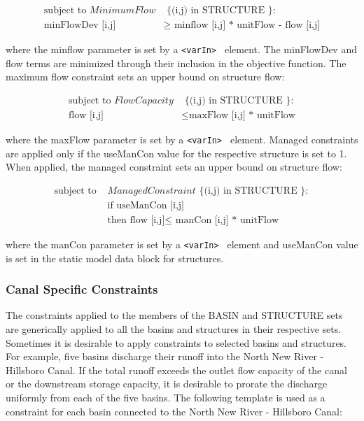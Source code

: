 \begin{equation}
 \begin{split}
  \textrm { subject to } MinimumFlow & \textrm { \{ (i,j) in STRUCTURE \} } : \\
  \textrm { minFlowDev [i,j] } & \ge  \textrm { minflow [i,j] * unitFlow - flow [i,j] } 
 \end{split}
\end{equation}

where the minflow parameter is set by a {\tt <varIn> } element.  The
minFlowDev and flow terms are minimized through their inclusion in the
objective function.  The maximum flow constraint sets an upper bound
on structure flow:

\begin{equation}
 \begin{split}
    \textrm {subject to } FlowCapacity & \textrm { \{ (i,j) in STRUCTURE \}} : \\ 
    \textrm {flow [i,j]} & \le \textrm {maxFlow [i,j] * unitFlow} 
 \end{split}
\end{equation}

where the maxFlow parameter is set by a {\tt <varIn> } element.
Managed constraints are applied only if the useManCon value for the
respective structure is set to 1.  When applied, the managed
constraint sets an upper bound on structure flow:

\begin{equation}
 \begin{split}
    \textrm {subject to } & ManagedConstraint \textrm { \{ (i,j) in STRUCTURE \} } :  \\ 
    &\textrm {if useManCon [i,j]} \\ 
    &\textrm {then flow [i,j]} \le \textrm { manCon [i,j] * unitFlow } 
 \end{split}
\end{equation}

where the manCon parameter is set by a {\tt <varIn> } element and
useManCon value is set in the static model data block for structures.

\subsubsection {Canal Specific Constraints }

The constraints applied to the members of the BASIN and STRUCTURE sets
are generically applied to all the basins and structures in their
respective sets.  Sometimes it is desirable to apply constraints to
selected basins and structures.  For example, five basins discharge
their runoff into the North New River \-- Hillsboro Canal. If the
total runoff exceeds the outlet flow capacity of the canal or the
downstream storage capacity, it is desirable to prorate the discharge
uniformly from each of the five basins.  The following template is
used as a constraint for each basin connected to the North New River
\-- Hillsboro Canal:

